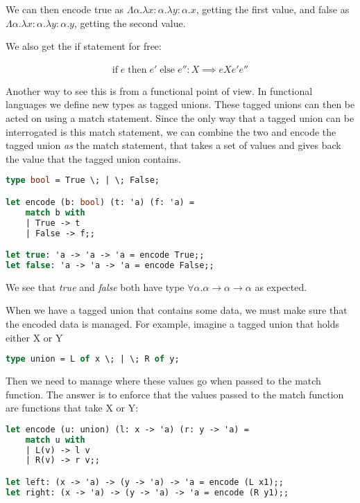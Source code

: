 \documentclass{article}
\newcommand{\inlineeq}[1]{
    \vspace{-2em}
    \begin{gather*}
    #1
    \end{gather*}
    \vspace{-2em}
}
\begin{document}
We can then encode true as $\Lambda \alpha . \lambda x : \alpha . \lambda y : \alpha . x$, getting the first value, and false as $\Lambda \alpha . \lambda x : \alpha . \lambda y : \alpha . y$, getting the second value.

We also get the if statement for free: 

\inlineeq{
\textrm{if} \; e \; \textrm{then} \; e' \; \textrm{else} \; e'' : X \implies e X e' e''
}

Another way to see this is from a functional point of view. In functional languages we define new types as tagged unions. These tagged unions can then be acted on using a match statement. Since the only way that a tagged union can be interrogated is this match statement, we can combine the two and encode the tagged union \textit{as} the match statement, that takes a set of values and gives back the value that the tagged union contains.

\begin{lstlisting}[language=ML]
type bool = True \; | \; False;

let encode (b: bool) (t: 'a) (f: 'a) = 
	match b with
	| True -> t
	| False -> f;;

let true: 'a -> 'a -> 'a = encode True;;
let false: 'a -> 'a -> 'a = encode False;;
\end{lstlisting}

We see that \textit{true} and \textit{false} both have type $\forall \alpha . \alpha  \to \alpha  \to \alpha $ as expected.

When we have a tagged union that contains some data, we must make sure that the encoded data is managed. For example, imagine a tagged union that holds either X or Y

\begin{lstlisting}[language=ML]
type union = L of x \; | \; R of y;
\end{lstlisting}

Then we need to manage where these values go when passed to the match function. The answer is to enforce that the values passed to the match function are functions that take X or Y:

\begin{lstlisting}[language=ML]
let encode (u: union) (l: x -> 'a) (r: y -> 'a) = 
	match u with
	| L(v) -> l v
	| R(v) -> r v;;

let left: (x -> 'a) -> (y -> 'a) -> 'a = encode (L x1);;
let right: (x -> 'a) -> (y -> 'a) -> 'a = encode (R y1);;
\end{lstlisting}
\end{document}
